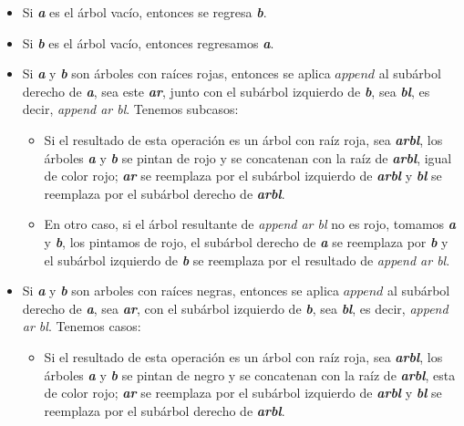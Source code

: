 \begin{itemize}
    \item Si \textbf{\textit{a}} es el \'arbol vacío, entonces se regresa \textbf{\textit{b}}.
    \item Si \textbf{\textit{b}} es el \'arbol vacío, entonces regresamos \textbf{\textit{a}}.
    \item Si \textbf{\textit{a}} y \textbf{\textit{b}} son \'arboles con raíces rojas, entonces se 
    aplica $append$ al subárbol derecho de \textbf{\textit{a}}, sea este \textbf{\textit{ar}}, 
    junto con el subárbol izquierdo de \textbf{\textit{b}}, sea \textbf{\textit{bl}}, es decir, 
    \textit{append ar bl}. Tenemos subcasos:
    \begin{itemize}
      \item Si el resultado de esta operación es un árbol con raíz roja, sea \textbf{\textit{arbl}},
      los \'arboles \textbf{\textit{a}} y \textbf{\textit{b}} se pintan de rojo y se concatenan con 
      la raíz de \textbf{\textit{arbl}}, igual de color rojo; \textbf{\textit{ar}} se reemplaza por 
      el subárbol izquierdo de \textbf{\textit{arbl}} y \textbf{\textit{bl}} se reemplaza por el
      subárbol derecho de \textbf{\textit{arbl}}.
      \item En otro caso, si el \'arbol resultante de \textit{append ar bl} no es rojo, tomamos 
      \textbf{\textit{a}} y \textbf{\textit{b}}, los pintamos de rojo, el subárbol derecho de
      \textbf{\textit{a}} se reemplaza por \textbf{\textit{b}} y el subárbol izquierdo de 
      \textbf{\textit{b}} se reemplaza por el resultado de \textit{append ar bl}.
    \end{itemize}
    \item Si \textbf{\textit{a}} y \textbf{\textit{b}} son arboles con raíces negras, entonces se 
    aplica $append$ al subárbol derecho de \textbf{\textit{a}}, sea \textbf{\textit{ar}}, con el
    subárbol izquierdo de \textbf{\textit{b}}, sea \textbf{\textit{bl}}, es decir, \textit{append
    ar bl}. Tenemos casos:
    \begin{itemize}
      \item Si el resultado de esta operación es un árbol con raíz roja, sea \textbf{\textit{arbl}},
      los \'arboles \textbf{\textit{a}} y \textbf{\textit{b}} se pintan de negro y se concatenan con
      la raíz de \textbf{\textit{arbl}}, esta de color rojo; \textbf{\textit{ar}} se reemplaza por 
      el subárbol izquierdo de \textbf{\textit{arbl}} y \textbf{\textit{bl}} se reemplaza por el 
      subárbol derecho de \textbf{\textit{arbl}}.

\end{itemize}
\end{itemize}
